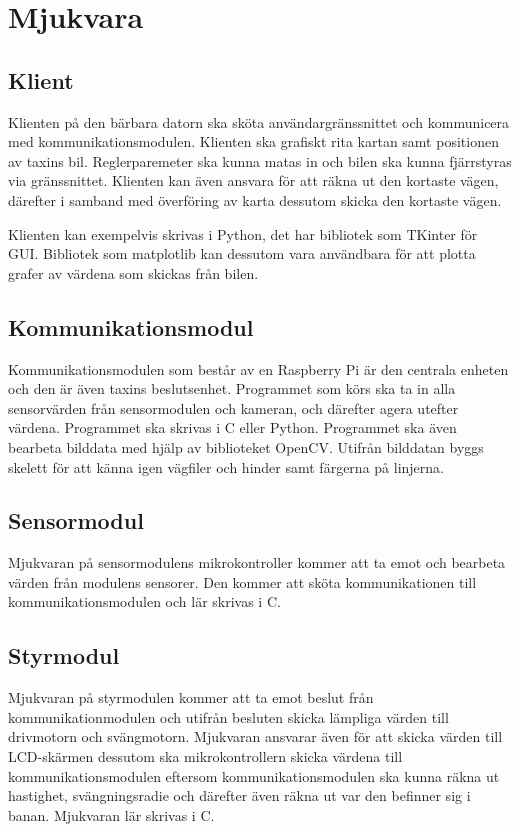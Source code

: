 \documentclass[systemskiss/skiss.tex]{subfiles}
\begin{document}
\section{Mjukvara}
\subsection{Klient}
Klienten på den bärbara datorn ska sköta användargränssnittet och kommunicera
med kommunikationsmodulen. Klienten ska grafiskt rita kartan samt positionen av
taxins bil. Reglerparemeter ska kunna matas in och bilen ska kunna fjärrstyras
via gränssnittet. Klienten kan även ansvara för att räkna ut den kortaste
vägen, därefter i samband med överföring av karta dessutom skicka den kortaste
vägen.

Klienten kan exempelvis skrivas i Python, det har bibliotek som TKinter för
GUI. Bibliotek som matplotlib kan dessutom vara användbara för att plotta
grafer av värdena som skickas från bilen.

\subsection{Kommunikationsmodul}
Kommunikationsmodulen som består av en Raspberry Pi är den centrala enheten och
den är även taxins beslutsenhet. Programmet som körs ska ta in alla
sensorvärden från sensormodulen och kameran, och därefter agera utefter
värdena. Programmet ska skrivas i C eller Python. Programmet ska även bearbeta
bilddata med hjälp av biblioteket OpenCV. Utifrån bilddatan byggs skelett för
att känna igen vägfiler och hinder samt färgerna på linjerna.

\subsection{Sensormodul}
Mjukvaran på sensormodulens mikrokontroller kommer att ta emot och bearbeta
värden från modulens sensorer. Den kommer att sköta kommunikationen till
kommunikationsmodulen och lär skrivas i C.


\subsection{Styrmodul}
Mjukvaran på styrmodulen kommer att ta emot beslut från kommunikationmodulen och
utifrån besluten skicka lämpliga värden till drivmotorn och svängmotorn.
Mjukvaran ansvarar även för att skicka värden till LCD-skärmen dessutom ska 
mikrokontrollern skicka värdena till kommunikationsmodulen eftersom
kommunikationsmodulen ska kunna räkna ut hastighet, svängningsradie och
därefter även räkna ut var den befinner sig i banan. Mjukvaran lär skrivas i C.
 
\end{document}
